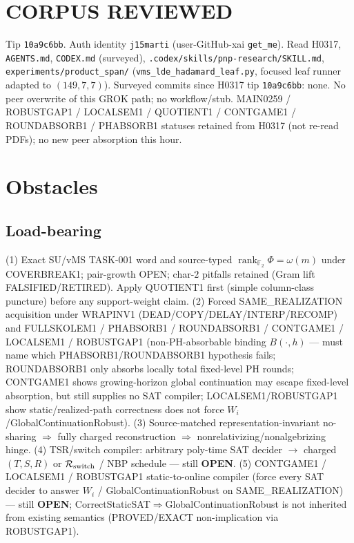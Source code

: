 \documentclass[11pt]{article}
\begin{document}
\section*{CORPUS REVIEWED}
Tip \texttt{10a9c6bb}. Auth identity \texttt{j15marti} (user-GitHub-xai \texttt{get\_me}).
Read H0317,
\texttt{AGENTS.md}, \texttt{CODEX.md} (surveyed), \texttt{.codex/skills/pnp-research/SKILL.md},
\texttt{experiments/product\_span/}
(\texttt{vms\_lde\_hadamard\_leaf.py}, focused leaf runner adapted to $(149,7,7)$).
Surveyed commits since H0317 tip \texttt{10a9c6bb}: none.
No peer overwrite of this GROK path; no workflow/stub.
MAIN0259 / ROBUSTGAP1 / LOCALSEM1 / QUOTIENT1 / CONTGAME1 / ROUNDABSORB1 / PHABSORB1
statuses retained from H0317 (not re-read PDFs); no new peer absorption this hour.

\section*{Obstacles}
\subsection*{Load-bearing}
(1) Exact SU/vMS TASK-001 word and source-typed
$\operatorname{rank}_{\mathbb F_2}\Phi=\omega(m)$ under COVERBREAK1; pair-growth OPEN;
char-$2$ pitfalls retained (Gram lift FALSIFIED/RETIRED). Apply QUOTIENT1 first
(simple column-class puncture) before any support-weight claim.
(2) Forced SAME\_REALIZATION acquisition under WRAPINV1
(DEAD/COPY/DELAY/INTERP/RECOMP) and FULLSKOLEM1 / PHABSORB1 / ROUNDABSORB1 / CONTGAME1 /
LOCALSEM1 / ROBUSTGAP1
(non-PH-absorbable binding $B(\cdot,h)$ --- must name which PHABSORB1/ROUNDABSORB1
hypothesis fails; ROUNDABSORB1 only absorbs locally total fixed-level PH rounds;
CONTGAME1 shows growing-horizon global continuation may escape fixed-level absorption,
but still supplies no SAT compiler; LOCALSEM1/ROBUSTGAP1 show static/realized-path
correctness does not force $W_i$/GlobalContinuationRobust).
(3) Source-matched representation-invariant no-sharing $\Rightarrow$ fully charged reconstruction
$\Rightarrow$ nonrelativizing/nonalgebrizing hinge.
(4) TSR/switch compiler: arbitrary poly-time SAT decider $\to$ charged $(T,S,R)$ or
$\mathcal R_{\rm switch}$ / NBP schedule --- still \textbf{OPEN}.
(5) CONTGAME1 / LOCALSEM1 / ROBUSTGAP1 static-to-online compiler (force every SAT decider to
answer $W_i$ / GlobalContinuationRobust on SAME\_REALIZATION) --- still \textbf{OPEN};
CorrectStaticSAT$\Rightarrow$GlobalContinuationRobust is not inherited from existing semantics
(PROVED/EXACT non-implication via ROBUSTGAP1).
\end{document}
